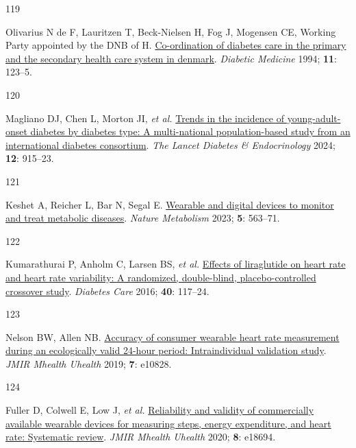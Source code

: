 \documentclass[
  a4paper,
  headsepline=true,
  open=any]{scrbook}
\newlength{\cslhangindent}
\newlength{\csllabelwidth}
\newlength{\cslentryspacingunit} %
\newenvironment{CSLReferences}[2] %
 {%
  \setlength{\parindent}{0pt}
  \ifodd #1
  \let\oldpar\par
  \def\par{\hangindent=\cslhangindent\oldpar}
  \fi
  \setlength{\parskip}{#2\cslentryspacingunit}
 }%
 {}
\newcommand{\CSLLeftMargin}[1]{\parbox[t]{\csllabelwidth}{#1}}
\newcommand{\CSLRightInline}[1]{\parbox[t]{\linewidth - \csllabelwidth}{#1}\break}
\begin{document}
\begin{CSLReferences}{0}{0}
\leavevmode{}%
\CSLLeftMargin{119 }%
\CSLRightInline{Olivarius N de F, Lauritzen T, Beck-Nielsen H, Fog J,
Mogensen CE, Working Party appointed by the DNB of H.
\href{https://doi.org/10.1111/j.1464-5491.1994.tb00243.x}{Co-ordination
of diabetes care in the primary and the secondary health care system in
denmark}. \emph{Diabetic Medicine} 1994; \textbf{11}: 123--5.}

\leavevmode{}%
\CSLLeftMargin{120 }%
\CSLRightInline{Magliano DJ, Chen L, Morton JI, \emph{et al.}
\href{https://doi.org/10.1016/S2213-8587(24)00243-2}{Trends in the
incidence of young-adult-onset diabetes by diabetes type: A
multi-national population-based study from an international diabetes
consortium}. \emph{The Lancet Diabetes \& Endocrinology} 2024;
\textbf{12}: 915--23.}

\leavevmode{}%
\CSLLeftMargin{121 }%
\CSLRightInline{Keshet A, Reicher L, Bar N, Segal E.
\href{https://doi.org/10.1038/s42255-023-00778-y}{Wearable and digital
devices to monitor and treat metabolic diseases}. \emph{Nature
Metabolism} 2023; \textbf{5}: 563--71.}

\leavevmode{}%
\CSLLeftMargin{122 }%
\CSLRightInline{Kumarathurai P, Anholm C, Larsen BS, \emph{et al.}
\href{https://doi.org/10.2337/dc16-1580}{Effects of liraglutide on heart
rate and heart rate variability: A randomized, double-blind,
placebo-controlled crossover study}. \emph{Diabetes Care} 2016;
\textbf{40}: 117--24.}

\leavevmode{}%
\CSLLeftMargin{123 }%
\CSLRightInline{Nelson BW, Allen NB.
\href{https://doi.org/10.2196/10828}{Accuracy of consumer wearable heart
rate measurement during an ecologically valid 24-hour period:
Intraindividual validation study}. \emph{JMIR Mhealth Uhealth} 2019;
\textbf{7}: e10828.}

\leavevmode{}%
\CSLLeftMargin{124 }%
\CSLRightInline{Fuller D, Colwell E, Low J, \emph{et al.}
\href{https://doi.org/10.2196/18694}{Reliability and validity of
commercially available wearable devices for measuring steps, energy
expenditure, and heart rate: Systematic review}. \emph{JMIR Mhealth
Uhealth} 2020; \textbf{8}: e18694.}

\end{CSLReferences}

\end{document}
